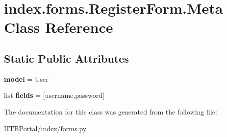 \hypertarget{classindex_1_1forms_1_1RegisterForm_1_1Meta}{}\section{index.\+forms.\+Register\+Form.\+Meta Class Reference}
\label{classindex_1_1forms_1_1RegisterForm_1_1Meta}
\subsection*{Static Public Attributes}
\begin{DoxyCompactItemize}
\item 
\mbox{\label{classindex_1_1forms_1_1RegisterForm_1_1Meta_af67f70a0b69007708557c4d8bf2ae8a1}} 
{\bfseries model} = User
\item 
\mbox{\label{classindex_1_1forms_1_1RegisterForm_1_1Meta_a96584124f88eede9a77fd1990b2bbdab}} 
list {\bfseries fields} = \mbox{[}\textquotesingle{}username\textquotesingle{},\textquotesingle{}password\textquotesingle{}\mbox{]}
\end{DoxyCompactItemize}


The documentation for this class was generated from the following file\+:\begin{DoxyCompactItemize}
\item 
I\+I\+T\+B\+Portal/index/forms.\+py\end{DoxyCompactItemize}
